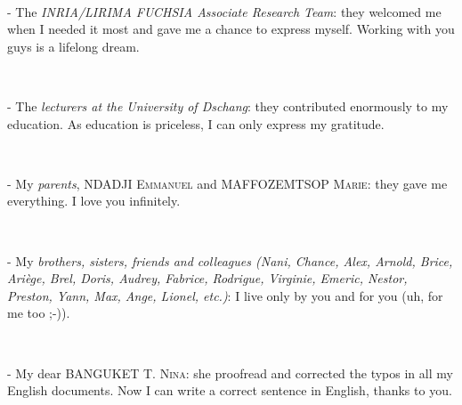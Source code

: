 ~

\noindent- The \textit{INRIA/LIRIMA FUCHSIA Associate Research Team}: they welcomed me when I needed it most and gave me a chance to express myself. Working with you guys is a lifelong dream.

~

\noindent- The \textit{lecturers at the University of Dschang}: they contributed enormously to my education. As education is priceless, I can only express my gratitude.

~

\noindent- My \textit{parents}, \textsc{NDADJI Emmanuel} and \textsc{MAFFOZEMTSOP Marie}: they gave me everything. I love you infinitely.

~

\noindent- My \textit{brothers, sisters, friends and colleagues (Nani, Chance, Alex, Arnold, Brice, Ari\`ege, Brel, Doris, Audrey, Fabrice, Rodrigue, Virginie, Emeric, Nestor, Preston, Yann, Max, Ange, Lionel, etc.)}: I live only by you and for you (uh, for me too ;-)).

~

\noindent- My dear \textsc{BANGUKET T. Nina}: she proofread and corrected the typos in all my English documents. Now I can write a correct sentence in English, thanks to you.




\myCleanStarChapterEnd

